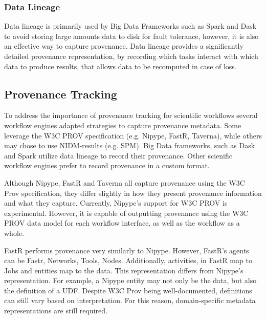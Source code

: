             \subsubsection{Data Lineage}
                Data lineage is primarily used by Big Data Frameworks such as
                Spark and Dask to avoid storing large amounts data to disk for
                fault tolerance, however, it is also an effective way to capture
                provenance. Data lineage provides a significantly detailed
                provenance representation, by recording which tasks interact
                with which data to produce results, that allows data to be
                recomputed in case of loss. 

        \subsection{Provenance Tracking}\label{prov}

            To address the importance of provenance tracking for scientific
            workflows several workflow engines adapted strategies to capture
            provenance metadata. Some leverage the W3C PROV specification (e.g.
            Nipype, FastR, Taverna), while others may chose to use NIDM-results
            (e.g. SPM). Big Data frameworks, such as Dask and Spark utilize data
            lineage to record their provenance. Other scienific workflow engines
            prefer to record provenance in a custom format.

            Although Nipype, FastR and Taverna all capture provenance using the
            W3C Prov specification, they differ slightly in how they present
            provenance information and what they capture. Currently, Nipype's
            support for W3C PROV is experimental. However, it is capable of
            outputting provenance using the W3C PROV data model for each
            workflow interface, as well as the workflow as a whole.
    
            FastR performs provenance very similarly to Nipype. However, FastR's
            agents can be Fastr, Networks, Tools, Nodes. Additionally,
            activities, in FastR map to Jobs and entities map to the data. This
            representation differs from Nipype's representation. For example, a
            Nipype entity may not only be the data, but also the definition of a
            UDF. Despite W3C Prov being well-documented, definitions can still
            vary based on interpretation. For this reason, domain-specific
            metadata representations are still required.
    
